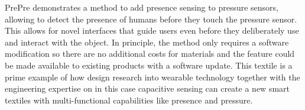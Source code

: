 \documentclass{sigchi-ext}
\begin{document}
PrePre demonstrates a method to add presence sensing to pressure sensors, allowing to detect the presence of humans before they touch the pressure sensor. This allows for novel interfaces that guide users even before they deliberately use and interact with the object. In principle, the method only requires a software modification so there are no additional costs for materials and the feature could be made available to existing products with a software update. This textile is a prime example of how design research into wearable technology together with the engineering expertise on in this case capacitive sensing can create a new smart textiles with multi-functional capabilities like presence and pressure. 
\begin{marginfigure}
\begin{minipage}{\marginparwidth}
\centering
\includegraphics[trim={0 0 0 -11.5cm},clip,width=0.9\columnwidt
\end{minipage}
\end{marginfigure}
\end{document}
